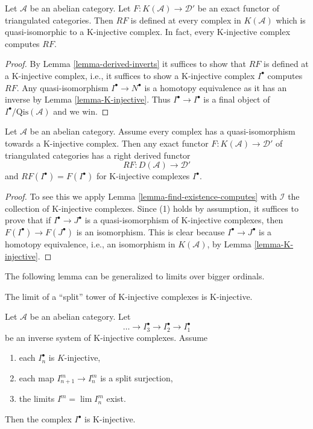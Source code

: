 \begin{lemma}
\label{lemma-K-injective-defined}
Let $\mathcal{A}$ be an abelian category.
Let $F : K(\mathcal{A}) \to \mathcal{D}'$ be an exact functor
of triangulated categories. Then $RF$ is defined at every complex
in $K(\mathcal{A})$ which is quasi-isomorphic to a
K-injective complex. In fact, every K-injective complex computes $RF$.
\end{lemma}

\begin{proof}
By
Lemma \ref{lemma-derived-inverts}
it suffices to show that $RF$ is defined at a K-injective complex,
i.e., it suffices to show a K-injective complex $I^\bullet$ computes $RF$.
Any quasi-isomorphism $I^\bullet \to N^\bullet$ is a homotopy equivalence
as it has an inverse by
Lemma \ref{lemma-K-injective}.
Thus $I^\bullet \to I^\bullet$ is a final object of
$I^\bullet/\text{Qis}(\mathcal{A})$ and we win.
\end{proof}

\begin{lemma}
\label{lemma-enough-K-injectives-implies}
Let $\mathcal{A}$ be an abelian category.
Assume every complex has a quasi-isomorphism towards a K-injective complex.
Then any exact functor $F : K(\mathcal{A}) \to \mathcal{D}'$ of triangulated
categories has a right derived functor
$$
RF : D(\mathcal{A}) \longrightarrow \mathcal{D}'
$$
and $RF(I^\bullet) = F(I^\bullet)$ for K-injective complexes $I^\bullet$.
\end{lemma}

\begin{proof}
To see this we apply
Lemma \ref{lemma-find-existence-computes}
with $\mathcal{I}$ the collection of K-injective complexes. Since (1)
holds by assumption, it suffices to prove that if $I^\bullet \to J^\bullet$
is a quasi-isomorphism of K-injective complexes, then
$F(I^\bullet) \to F(J^\bullet)$ is an isomorphism. This is clear because
$I^\bullet \to J^\bullet$ is a homotopy equivalence, i.e., an
isomorphism in $K(\mathcal{A})$, by
Lemma \ref{lemma-K-injective}.
\end{proof}

\noindent
The following lemma can be generalized to limits over bigger ordinals.

\begin{lemma}
\label{lemma-limit-K-injectives}
\begin{slogan}
The limit of a ``split'' tower of K-injective complexes is K-injective.
\end{slogan}
Let $\mathcal{A}$ be an abelian category. Let
$$
\ldots \to I_3^\bullet \to I_2^\bullet \to I_1^\bullet
$$
be an inverse system of K-injective complexes. Assume
\begin{enumerate}
\item each $I_n^\bullet$ is $K$-injective,
\item each map $I_{n + 1}^m \to I_n^m$ is a split surjection,
\item the limits $I^m = \lim I_n^m$ exist.
\end{enumerate}
Then the complex $I^\bullet$ is K-injective.
\end{lemma}

